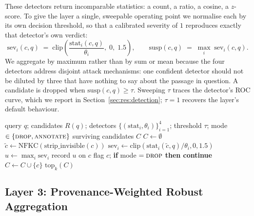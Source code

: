 \documentclass[information,article,submit,moreauthors]{Definitions/mdpi}
\begin{document}
These detectors return incomparable statistics: a count, a ratio, a cosine, a $z$-score. To
give the layer a single, sweepable operating point we normalise each by its own decision
threshold, so that a calibrated severity of $1$ reproduces exactly that detector's own verdict:
\begin{equation}
\mathrm{sev}_i(c, q) \;=\; \mathrm{clip}\!\left(\frac{\mathrm{stat}_i(c, q)}{\theta_i},\; 0,\; 1.5\right),
\qquad
\mathrm{susp}(c, q) \;=\; \max_i \; \mathrm{sev}_i(c, q).
\label{eq:suspicion}
\end{equation}
We aggregate by maximum rather than by sum or mean because the four detectors address disjoint
attack mechanisms: one confident detector should not be diluted by three that have nothing to
say about the passage in question. A candidate is dropped when $\mathrm{susp}(c,q) \ge \tau$.
Sweeping $\tau$ traces the detector's ROC curve, which we report in
Section~\ref{sec:res:detection}; $\tau = 1$ recovers the layer's default behaviour.

\begin{algorithm}[H]
\caption{Layer 2: calibrated retrieval filtering}
\label{alg:l2}
\begin{algorithmic}[1]
\Require query $q$; candidates $R(q)$; detectors $\{(\mathrm{stat}_i, \theta_i)\}_{i=1}^{4}$;
threshold $\tau$; mode $\in \{\textsc{drop}, \textsc{annotate}\}$
\Ensure surviving candidates $C$
\State $C \gets \emptyset$
  \State $\tilde{c} \gets \mathrm{NFKC}(\mathrm{strip\_invisible}(c))$ 
     \State $\mathrm{sev}_i \gets \mathrm{clip}(\mathrm{stat}_i(\tilde{c}, q) / \theta_i, 0, 1.5)$
  \EndFor
  \State $u \gets \max_i \mathrm{sev}_i$ 
  \State record $u$ on $c$ 
     \State flag $c$; \textbf{if} mode $=\textsc{drop}$ \textbf{then continue}
  \EndIf
  \State $C \gets C \cup \{c\}$
\EndFor
\State \Return $\mathrm{top}_k(C)$ 
\end{algorithmic}
\end{algorithm}

\subsection{Layer 3: Provenance-Weighted Robust Aggregation}
\label{sec:l3}
\end{document}
